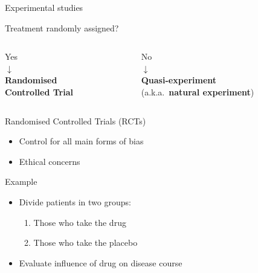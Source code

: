 \begin{frame}{Experimental studies}
    \begin{center}
        Treatment randomly assigned?
    \end{center}
    \begin{columns}[t]
        \begin{column}{0.5\textwidth}
            \centering
            Yes \\[\bigskipamount]
            $\downarrow$ \\[\bigskipamount]
            \textbf{Randomised\\Controlled Trial}
        \end{column}
        \begin{column}{0.5\textwidth}
            \centering
            No \\[\bigskipamount]
            $\downarrow$ \\[\bigskipamount]
            \textbf{Quasi\hyp{}experiment} \\
            (a.k.a.\ \textbf{natural experiment})
        \end{column}
    \end{columns}
\end{frame}

\begin{frame}[t]{Randomised Controlled Trials (RCTs)}
    \begin{itemize}
        \item Control for all main forms of bias
        \item \alert{Ethical concerns}
    \end{itemize}
    \vfill
    \begin{block}{Example}
        \begin{itemize}
            \item Divide patients in two groups:
                  \begin{enumerate}
                      \item Those who take the drug
                      \item Those who take the placebo
                  \end{enumerate}
            \item Evaluate influence of drug on disease course
        \end{itemize}
    \end{block}
\end{frame}

